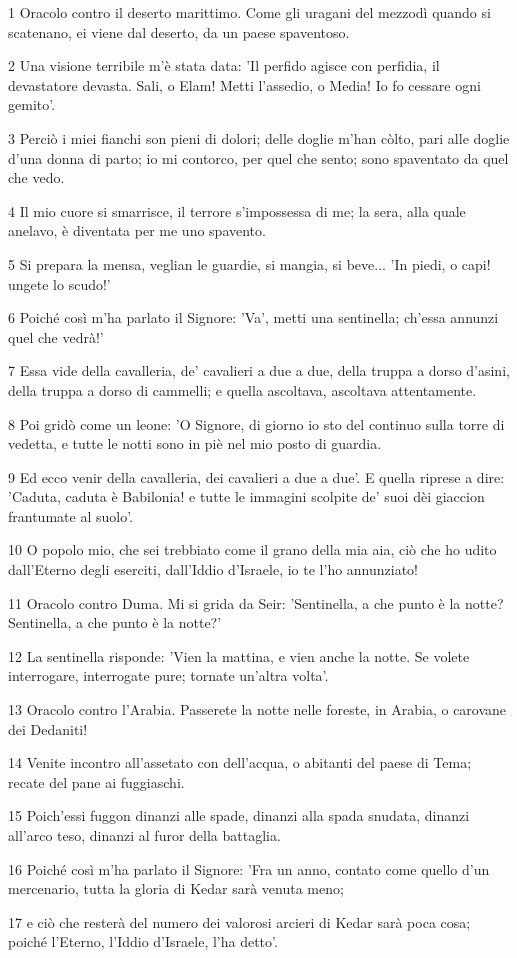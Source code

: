 \par 1 Oracolo contro il deserto marittimo. Come gli uragani del mezzodì quando si scatenano, ei viene dal deserto, da un paese spaventoso.
\par 2 Una visione terribile m'è stata data: 'Il perfido agisce con perfidia, il devastatore devasta. Sali, o Elam! Metti l'assedio, o Media! Io fo cessare ogni gemito'.
\par 3 Perciò i miei fianchi son pieni di dolori; delle doglie m'han còlto, pari alle doglie d'una donna di parto; io mi contorco, per quel che sento; sono spaventato da quel che vedo.
\par 4 Il mio cuore si smarrisce, il terrore s'impossessa di me; la sera, alla quale anelavo, è diventata per me uno spavento.
\par 5 Si prepara la mensa, veglian le guardie, si mangia, si beve... 'In piedi, o capi! ungete lo scudo!'
\par 6 Poiché così m'ha parlato il Signore: 'Va', metti una sentinella; ch'essa annunzi quel che vedrà!'
\par 7 Essa vide della cavalleria, de' cavalieri a due a due, della truppa a dorso d'asini, della truppa a dorso di cammelli; e quella ascoltava, ascoltava attentamente.
\par 8 Poi gridò come un leone: 'O Signore, di giorno io sto del continuo sulla torre di vedetta, e tutte le notti sono in piè nel mio posto di guardia.
\par 9 Ed ecco venir della cavalleria, dei cavalieri a due a due'. E quella riprese a dire: 'Caduta, caduta è Babilonia! e tutte le immagini scolpite de' suoi dèi giaccion frantumate al suolo'.
\par 10 O popolo mio, che sei trebbiato come il grano della mia aia, ciò che ho udito dall'Eterno degli eserciti, dall'Iddio d'Israele, io te l'ho annunziato!
\par 11 Oracolo contro Duma. Mi si grida da Seir: 'Sentinella, a che punto è la notte? Sentinella, a che punto è la notte?'
\par 12 La sentinella risponde: 'Vien la mattina, e vien anche la notte. Se volete interrogare, interrogate pure; tornate un'altra volta'.
\par 13 Oracolo contro l'Arabia. Passerete la notte nelle foreste, in Arabia, o carovane dei Dedaniti!
\par 14 Venite incontro all'assetato con dell'acqua, o abitanti del paese di Tema; recate del pane ai fuggiaschi.
\par 15 Poich'essi fuggon dinanzi alle spade, dinanzi alla spada snudata, dinanzi all'arco teso, dinanzi al furor della battaglia.
\par 16 Poiché così m'ha parlato il Signore: 'Fra un anno, contato come quello d'un mercenario, tutta la gloria di Kedar sarà venuta meno;
\par 17 e ciò che resterà del numero dei valorosi arcieri di Kedar sarà poca cosa; poiché l'Eterno, l'Iddio d'Israele, l'ha detto'.

